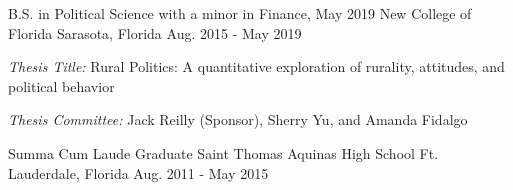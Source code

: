 

\begin{cventries}

  \cventry
    {B.S. in Political Science with a minor in Finance, May 2019} %
    {New College of Florida} %
    {Sarasota, Florida} %
    {Aug. 2015 - May 2019} %
    {
    \begin{cvitems}
      \item \emph{Thesis Title:} Rural Politics: A quantitative exploration of rurality, attitudes, and political behavior
      \item \emph{Thesis Committee:} Jack Reilly (Sponsor), Sherry Yu, and Amanda Fidalgo
    \end{cvitems}
  }

  \cventry
    {Summa Cum Laude Graduate} %
    {Saint Thomas Aquinas High School} %
    {Ft. Lauderdale, Florida} %
    {Aug. 2011 - May 2015} %
    {}


\vspace{-.1cm}


\end{cventries}

